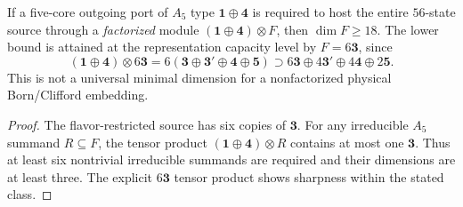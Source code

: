 \documentclass[12pt,a4paper]{article}
\begin{document}
\begin{corollary}
\label{p11:cor:v369-five-core-factorized-capacity}
If a five-core outgoing port of $A_5$ type $\mathbf1\oplus\mathbf4$
is required to host the entire $56$-state source through a
\emph{factorized} module $(\mathbf1\oplus\mathbf4)\otimes F$, then
$\dim F\ge18$.  The lower bound is attained at the representation
capacity level by $F=6\mathbf3$, since
\[
 (\mathbf1\oplus\mathbf4)\otimes6\mathbf3
 =6(\mathbf3\oplus\mathbf3'\oplus\mathbf4\oplus\mathbf5)
 \supset6\mathbf3\oplus4\mathbf3'\oplus4\mathbf4\oplus2\mathbf5.
\]
This is not a universal minimal dimension for a nonfactorized physical
Born/Clifford embedding.
\end{corollary}
\begin{proof}
The flavor-restricted source has six copies of $\mathbf3$.  For any
irreducible $A_5$ summand $R\subseteq F$, the tensor product
$(\mathbf1\oplus\mathbf4)\otimes R$ contains at most one
$\mathbf3$.  Thus at least six nontrivial irreducible summands are
required and their dimensions are at least three.  The explicit
$6\mathbf3$ tensor product shows sharpness within the stated class.
\end{proof}
\end{document}
